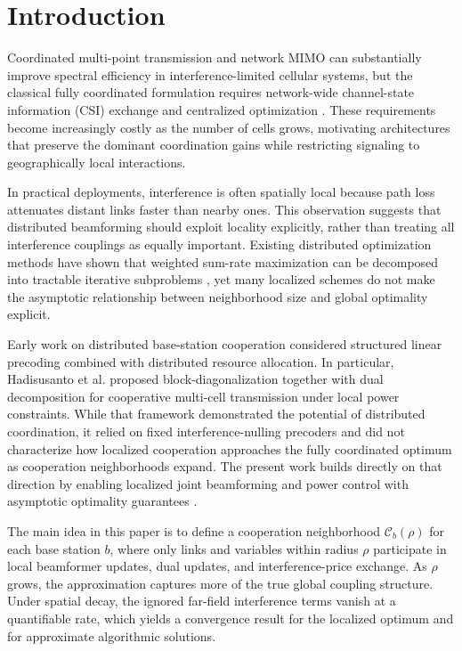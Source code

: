 \section{Introduction}

Coordinated multi-point transmission and network MIMO can substantially improve spectral efficiency in interference-limited cellular systems, but the classical fully coordinated formulation requires network-wide channel-state information (CSI) exchange and centralized optimization \cite{Gesbert10}. These requirements become increasingly costly as the number of cells grows, motivating architectures that preserve the dominant coordination gains while restricting signaling to geographically local interactions.

In practical deployments, interference is often spatially local because path loss attenuates distant links faster than nearby ones. This observation suggests that distributed beamforming should exploit locality explicitly, rather than treating all interference couplings as equally important. Existing distributed optimization methods have shown that weighted sum-rate maximization can be decomposed into tractable iterative subproblems \cite{Shi11}, yet many localized schemes do not make the asymptotic relationship between neighborhood size and global optimality explicit.

Early work on distributed base-station cooperation considered structured linear precoding combined with distributed resource allocation. In particular, Hadisusanto et al. proposed block-diagonalization together with dual decomposition for cooperative multi-cell transmission under local power constraints. While that framework demonstrated the potential of distributed coordination, it relied on fixed interference-nulling precoders and did not characterize how localized cooperation approaches the fully coordinated optimum as cooperation neighborhoods expand. The present work builds directly on that direction by enabling localized joint beamforming and power control with asymptotic optimality guarantees \cite{Jungnickel08}.

The main idea in this paper is to define a cooperation neighborhood $\mathcal{C}_b(\rho)$ for each base station $b$, where only links and variables within radius $\rho$ participate in local beamformer updates, dual updates, and interference-price exchange. As $\rho$ grows, the approximation captures more of the true global coupling structure. Under spatial decay, the ignored far-field interference terms vanish at a quantifiable rate, which yields a convergence result for the localized optimum and for approximate algorithmic solutions.

